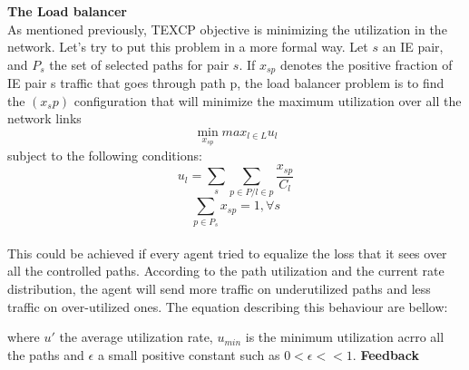 {\bf The Load balancer}
\\ As mentioned previously, TEXCP objective is minimizing the utilization in the network. Let's try to put this problem in a more formal way. Let $s$ an IE pair, and $P_s$ the set of selected paths for pair $s$. If $x_{sp}$ denotes the positive fraction of IE pair s traffic that goes through path p, the load balancer problem is to find the $(x_sp)$ configuration that will minimize the maximum utilization over all the network links 
\begin{equation}
\min_{x_{sp}} max_{l \in L} u_{l}
\end{equation}
subject to the following conditions:
\begin{equation}
u_l = \sum_{s} \sum_{p \in P / l \in p} \frac {x_{sp} }{C_l}
\end{equation}
\begin{equation}
\sum_{p \in P_{s}} x_{sp} = 1,  \forall s
\end{equation}
\\ This could be achieved if every agent tried to equalize the loss that it sees over all the controlled paths. According to the path utilization and the current rate distribution, the agent will send more traffic on underutilized paths and less traffic on over-utilized ones. The equation describing this behaviour are bellow:

where $u'$ the average utilization rate, $u_{min}$ is the minimum utilization acrro all the paths and $\epsilon$ a small positive constant such as  $ 0 < \epsilon << 1$.
{\bf Feedback}

